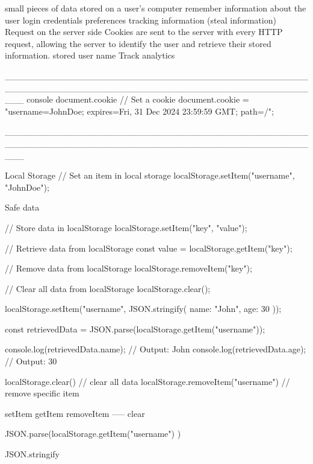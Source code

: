 small pieces of data
stored on a user's computer
remember information about the user
login credentials
preferences
tracking information    
(steal information)
Request on the server side
Cookies are sent to the server with every HTTP request, allowing the server to identify the user and retrieve their stored information.
stored user name
Track analytics

___________________________________________________________________________________________________
console 
document.cookie
// Set a cookie
document.cookie = "username=JohnDoe; expires=Fri, 31 Dec 2024 23:59:59 GMT; path=/";

___________________________________________________________________________________________________

Local Storage
// Set an item in local storage
localStorage.setItem("username", "JohnDoe");    

Safe data

// Store data in localStorage
localStorage.setItem("key", "value");

// Retrieve data from localStorage
const value = localStorage.getItem("key");

// Remove data from localStorage
localStorage.removeItem("key");

// Clear all data from localStorage
localStorage.clear();


localStorage.setItem("username", JSON.stringify({ name: "John", age: 30 }));

const retrievedData = JSON.parse(localStorage.getItem("username"));

console.log(retrievedData.name); // Output: John
console.log(retrievedData.age);  // Output: 30

localStorage.clear() // clear all data
localStorage.removeItem("username") // remove specific item



setItem
getItem
removeItem -----
clear   

JSON.parse(localStorage.getItem("username") )

JSON.stringify      


